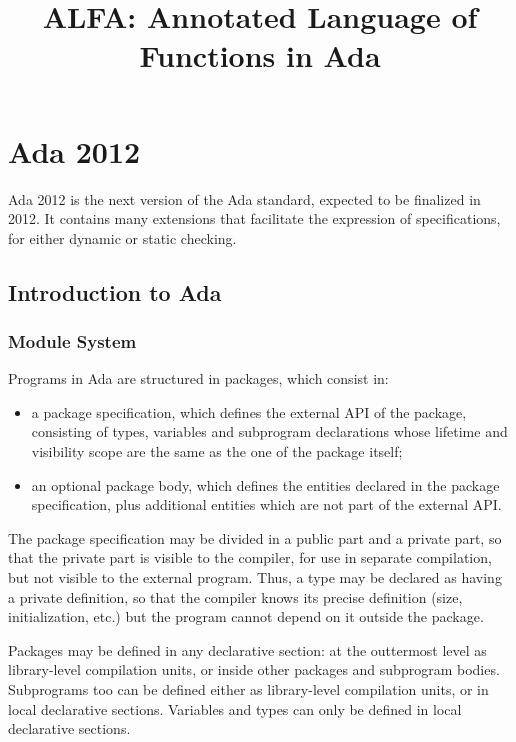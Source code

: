 \documentclass{article}
\title{ALFA: Annotated Language of Functions in Ada}
\begin{document}
\maketitle
\sloppy
\section{Ada 2012}

Ada 2012 is the next version of the Ada standard, expected to be finalized in
2012. It contains many extensions that facilitate the expression of
specifications, for either dynamic or static checking.

\subsection{Introduction to Ada}

\subsubsection{Module System}

Programs in Ada are structured in packages, which consist in:
\begin{itemize}
\item a package specification, which defines the external API of the package,
  consisting of types, variables and subprogram declarations whose lifetime and
  visibility scope are the same as the one of the package itself;
\item an optional package body, which defines the entities declared in the
  package specification, plus additional entities which are not part of the
  external API.
\end{itemize}

The package specification may be divided in a public part and a private part,
so that the private part is visible to the compiler, for use in separate
compilation, but not visible to the external program. Thus, a type may be
declared as having a private definition, so that the compiler knows its precise
definition (size, initialization, etc.) but the program cannot depend on it
outside the package.

Packages may be defined in any declarative section: at the outtermost level as
library-level compilation units, or inside other packages and subprogram
bodies. Subprograms too can be defined either as library-level compilation
units, or in local declarative sections. Variables and types can only be
defined in local declarative sections.
\end{document}

